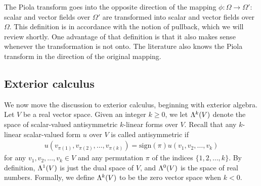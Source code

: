 \documentclass[10pt,letterpaper]{article}
\newcommand\cye[1]{%
\protect\leavevmode
\begingroup
    \color{red!35!yellow}%
    #1%
\endgroup
}
\newcommand{\mwl}[1]{{\color{red}#1}}
\begin{document}
\begin{remark}
    The Piola transform goes into the opposite direction of the mapping $\phi : \Omega \rightarrow \Omega'$:
    scalar and vector fields over $\Omega'$ are transformed into scalar and vector fields over $\Omega$.
    This definition is in accordance with the notion of pullback, which we will review shortly. 
    One advantage of that definition is that it also makes sense whenever the transformation is not onto. 
    The literature also knows the Piola transform in the direction of the original mapping. 
\end{remark}


\subsection{Exterior calculus}


\mwl{We now move the discussion to exterior calculus, beginning with exterior algebra.}
Let $V$ be a real vector space. 
Given an integer $k \geq 0$, we let $\Lambda^{k}(V)$ denote the space of scalar-valued antisymmetric $k$-linear forms over $V$. 
Recall that any $k$-linear scalar-valued form $u$ over $V$ is called antisymmetric
if 
\begin{gather*} 
    u( v_{\pi(1)}, v_{\pi(2)}, \ldots, v_{\pi(k)} ) 
    = 
    \text{sign}(\pi) 
    u( v_1, v_2, \ldots, v_k ) 
\end{gather*}
for any $v_1, v_2, \dots, v_k \in V$ and any permutation $\pi$ of the indices \(\{1, 2, \ldots, k\}\). 
By definition, $\Lambda^{1}(V)$ is just the dual space of $V$, and $\Lambda^{0}(V)$ is the space of real numbers. 
Formally, we define $\Lambda^{k}(V)$ to be the zero vector space when $k < 0$. 
\end{document}
